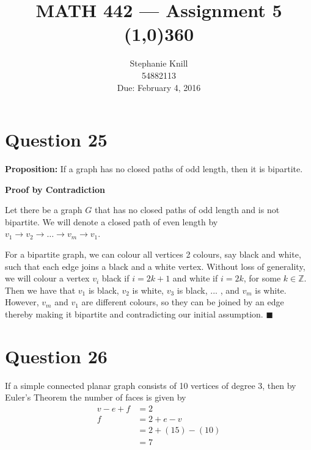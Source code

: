 \documentclass[11pt, oneside]{article}   	%
\newcommand*{\QEDA}{\hfill\ensuremath{\blacksquare}}         %
\begin{document}
\title{MATH 442 --- Assignment 5 \\
\line(1,0){360} \\              %
}
\author{
Stephanie Knill \\
54882113 \\
Due: February 4, 2016}

\date{}                   %
\maketitle




\section*{Question 25}

\textbf{Proposition:} If a graph has no closed paths of odd length, then it is bipartite.

\textbf{Proof by Contradiction} 

Let there be a graph $G$ that has no closed paths of odd length and is not bipartite. We will denote a closed path of even length by $v_1 \rightarrow v_2 \rightarrow \ldots \rightarrow v_m \rightarrow v_1$.

For a bipartite graph, we can colour all vertices 2 colours, say black and white, such that each edge joins a black and a white vertex. Without loss of generality, we will colour a vertex $v_i$ black if $i=2k+1$ and white if $i=2k$, for some $k \in \mathbb{Z}$. Then we have that $v_1$ is black, $v_2$ is white, $v_3$ is black, ... , and $v_m$ is white. However, $v_m$ and $v_1$ are different colours, so they can be joined by an edge thereby making it bipartite and contradicting our initial assumption. \QEDA


\section*{Question 26}

If a simple connected planar graph consists of 10 vertices of degree 3, then by Euler's Theorem the number of faces is given by
\begin{align*}
	v - e + f & = 2 \\
	f & = 2 + e - v \\
	 & = 2 + (15) - (10) \\
	& = 7
\end{align*}
\end{document}
